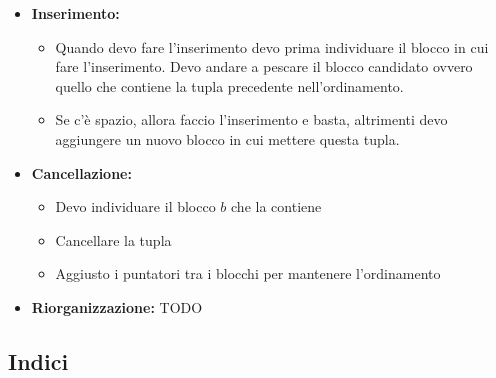 \documentclass[a4paper]{article}
\begin{document}
\begin{itemize}
\begin{itemize}
        \item \textbf{Inserimento: }
        \begin{itemize}
            \item Quando devo fare l'inserimento
            devo prima individuare il blocco in cui fare l'inserimento.
            Devo andare a pescare il blocco candidato ovvero quello che contiene
            la tupla precedente nell'ordinamento.
            \item Se c'è spazio, allora faccio l'inserimento e basta, altrimenti
            devo aggiungere un nuovo blocco in cui mettere questa tupla.
        \end{itemize}
        \item \textbf{Cancellazione: }
        \begin{itemize}
            \item Devo individuare il blocco $b$ che la contiene
            \item Cancellare la tupla
            \item Aggiusto i puntatori tra i blocchi per mantenere l'ordinamento
        \end{itemize}
        \item \textbf{Riorganizzazione: }
        TODO
    \end{itemize}
\end{itemize}

\subsection{Indici}
\end{document}
